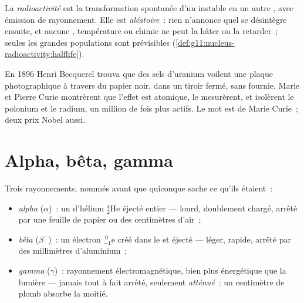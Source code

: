 \begin{definition}[Radioactivité]\label{def:g11:nucleus-radioactivity:radioactivity}
La \emph{radioactivité} est la transformation
spontanée d'un  instable en un
autre , avec émission de
rayonnement. Elle est \emph{aléatoire}~: rien n'annonce quel
 se désintègre ensuite, et aucune
, température ou chimie ne peut
la hâter ou la retarder~; seules les grandes populations sont
prévisibles (\cref{def:g11:nucleus-radioactivity:halflife}).
\end{definition}

\begin{remark}\label{rem:g11:nucleus-radioactivity:curie}
En 1896 Henri Becquerel trouva que des sels d'uranium voilent une plaque
photographique à travers du papier noir, dans un tiroir fermé, sans
 fournie. Marie et Pierre
Curie montrèrent que l'effet est atomique, le mesurèrent, et isolèrent
le polonium et le radium, un million de fois plus actifs. Le mot
\emph{} est de Marie
Curie~; deux prix Nobel aussi.
\end{remark}

\section{Alpha, bêta, gamma}

\begin{definition}\label{def:g11:nucleus-radioactivity:abg}
Trois rayonnements, nommés avant que quiconque sache ce qu'ils étaient~:
\begin{itemize}
  \item \emph{alpha} ($\alpha$)~: un
         d'hélium
        ${}^{4}_{2}\mathrm{He}$ éjecté entier --- lourd, doublement
        chargé, arrêté par une feuille de papier ou des centimètres
        d'air~;
  \item \emph{bêta} ($\beta^-$)~: un électron
        ${}^{\;0}_{-1}\mathrm{e}$ créé dans le
         et éjecté --- léger,
        rapide, arrêté par des millimètres d'aluminium~;
  \item \emph{gamma} ($\gamma$)~: rayonnement
        électromagnétique, bien plus énergétique que la lumière ---
        jamais tout à fait arrêté, seulement
        \emph{atténué}~: un centimètre de plomb
        absorbe la moitié.
\end{itemize}
\end{definition}

